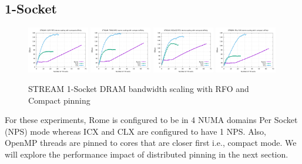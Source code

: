 \documentclass{article}
\begin{document}
\subsection{1-Socket}
\begin{figure}[!ht]
    \centering
    \includegraphics[width=0.24\textwidth]{../data/rome-clx-icx/mem_bw_scale/mb_scale_compact_Copy_rfo}
    \includegraphics[width=0.24\textwidth]{../data/rome-clx-icx/mem_bw_scale/mb_scale_compact_Triad_rfo}
    \includegraphics[width=0.24\textwidth]{../data/rome-clx-icx/mem_bw_scale/mb_scale_compact_Reduce_rfo}
    \includegraphics[width=0.24\textwidth]{../data/rome-clx-icx/mem_bw_scale/mb_scale_compact_Fill_rfo}
    \caption{STREAM 1-Socket DRAM bandwidth scaling with RFO and Compact pinning}
    \label{figure:mem_bw_scale_compact_rfo}
\end{figure}

For these experiments, Rome is configured to be in 4 NUMA domains Per Socket (NPS) mode whereas ICX and CLX are configured to have 1 NPS. Also, OpenMP threads are pinned to cores that are closer first i.e., compact mode. We will explore the performance impact of distributed pinning in the next section.
\end{document}
